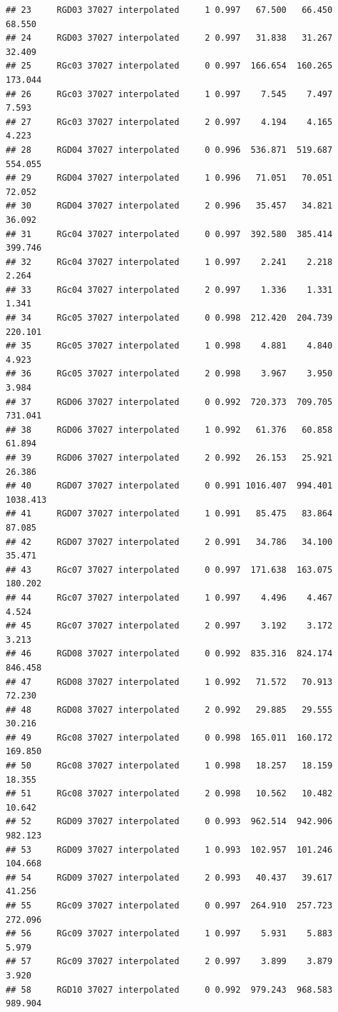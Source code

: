 \documentclass[]{article}
\begin{document}
\begin{verbatim}
## 23     RGD03 37027 interpolated     1 0.997   67.500   66.450   68.550
## 24     RGD03 37027 interpolated     2 0.997   31.838   31.267   32.409
## 25     RGc03 37027 interpolated     0 0.997  166.654  160.265  173.044
## 26     RGc03 37027 interpolated     1 0.997    7.545    7.497    7.593
## 27     RGc03 37027 interpolated     2 0.997    4.194    4.165    4.223
## 28     RGD04 37027 interpolated     0 0.996  536.871  519.687  554.055
## 29     RGD04 37027 interpolated     1 0.996   71.051   70.051   72.052
## 30     RGD04 37027 interpolated     2 0.996   35.457   34.821   36.092
## 31     RGc04 37027 interpolated     0 0.997  392.580  385.414  399.746
## 32     RGc04 37027 interpolated     1 0.997    2.241    2.218    2.264
## 33     RGc04 37027 interpolated     2 0.997    1.336    1.331    1.341
## 34     RGc05 37027 interpolated     0 0.998  212.420  204.739  220.101
## 35     RGc05 37027 interpolated     1 0.998    4.881    4.840    4.923
## 36     RGc05 37027 interpolated     2 0.998    3.967    3.950    3.984
## 37     RGD06 37027 interpolated     0 0.992  720.373  709.705  731.041
## 38     RGD06 37027 interpolated     1 0.992   61.376   60.858   61.894
## 39     RGD06 37027 interpolated     2 0.992   26.153   25.921   26.386
## 40     RGD07 37027 interpolated     0 0.991 1016.407  994.401 1038.413
## 41     RGD07 37027 interpolated     1 0.991   85.475   83.864   87.085
## 42     RGD07 37027 interpolated     2 0.991   34.786   34.100   35.471
## 43     RGc07 37027 interpolated     0 0.997  171.638  163.075  180.202
## 44     RGc07 37027 interpolated     1 0.997    4.496    4.467    4.524
## 45     RGc07 37027 interpolated     2 0.997    3.192    3.172    3.213
## 46     RGD08 37027 interpolated     0 0.992  835.316  824.174  846.458
## 47     RGD08 37027 interpolated     1 0.992   71.572   70.913   72.230
## 48     RGD08 37027 interpolated     2 0.992   29.885   29.555   30.216
## 49     RGc08 37027 interpolated     0 0.998  165.011  160.172  169.850
## 50     RGc08 37027 interpolated     1 0.998   18.257   18.159   18.355
## 51     RGc08 37027 interpolated     2 0.998   10.562   10.482   10.642
## 52     RGD09 37027 interpolated     0 0.993  962.514  942.906  982.123
## 53     RGD09 37027 interpolated     1 0.993  102.957  101.246  104.668
## 54     RGD09 37027 interpolated     2 0.993   40.437   39.617   41.256
## 55     RGc09 37027 interpolated     0 0.997  264.910  257.723  272.096
## 56     RGc09 37027 interpolated     1 0.997    5.931    5.883    5.979
## 57     RGc09 37027 interpolated     2 0.997    3.899    3.879    3.920
## 58     RGD10 37027 interpolated     0 0.992  979.243  968.583  989.904

\end{verbatim}
\end{document}
